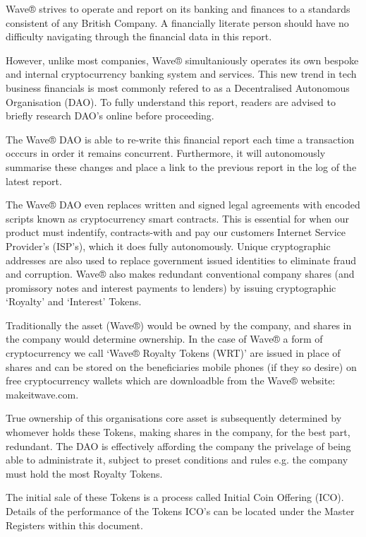 \documentclass[letterpaper,10pt,english]{sphinxmanual}
\begin{document}
Wave® strives to operate and report on its banking and finances to a standards consistent of any British Company.
A financially literate person should have no difficulty navigating through the financial data in this report.

However, unlike most companies, Wave® simultaniously operates its own bespoke and internal cryptocurrency banking system and services.
This new trend in tech business financials is most commonly refered to as a Decentralised Autonomous Organisation (DAO).
To fully understand this report, readers are advised to briefly research DAO’s online before proceeding.

The Wave® DAO is able to re-write this financial report each time a transaction occcurs in order it remains concurrent.
Furthermore, it will autonomously summarise these changes and place a link to the previous report in the log of the latest report.

The Wave® DAO even replaces written and signed legal agreements with encoded scripts known as cryptocurrency smart contracts.
This is essential for when our product must indentify, contracts-with and pay our customers Internet Service Provider’s (ISP’s), which it does fully autonomously.
Unique cryptographic addresses are also used to replace government issued identities to eliminate fraud and corruption.
Wave® also makes redundant conventional company shares (and promissory notes and interest payments to lenders) by issuing cryptographic ‘Royalty’ and ‘Interest’ Tokens.

Traditionally the asset (Wave®) would be owned by the company, and shares in the company would determine ownership.
In the case of Wave® a form of cryptocurrency we call ‘Wave® Royalty Tokens (WRT)’ are issued in place of shares and can be stored on the beneficiaries mobile phones (if they so desire) on free cryptocurrency wallets which are downloadble from the Wave®  website: makeitwave.com.

True ownership of this organisations core asset is subsequently determined by whomever holds these Tokens, making shares in the company, for the best part, redundant.
The DAO is effectively affording the company the privelage of being able to administrate it, subject to preset conditions and rules e.g. the company must hold the most Royalty Tokens.

The initial sale of these Tokens is a process called Initial Coin Offering (ICO).
Details of the performance of the Tokens ICO’s can be located under the Master Registers within this document.
\end{document}
